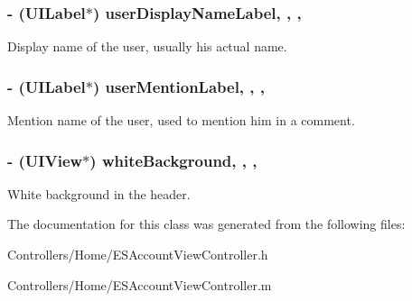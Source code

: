 \subsubsection[{user\+Display\+Name\+Label}]{\setlength{\rightskip}{0pt plus 5cm}-\/ (U\+I\+Label$\ast$) user\+Display\+Name\+Label\hspace{0.3cm}{\ttfamily [read]}, {\ttfamily [write]}, {\ttfamily [nonatomic]}, {\ttfamily [strong]}}\label{interface_e_s_account_view_controller_a4a3855adf0046a8e3d02466778099df2}
Display name of the user, usually his actual name. \hypertarget{interface_e_s_account_view_controller_a2c6e65c3ac71a2af27f3f3bb05d1b757}{}
\subsubsection[{user\+Mention\+Label}]{\setlength{\rightskip}{0pt plus 5cm}-\/ (U\+I\+Label$\ast$) user\+Mention\+Label\hspace{0.3cm}{\ttfamily [read]}, {\ttfamily [write]}, {\ttfamily [nonatomic]}, {\ttfamily [strong]}}\label{interface_e_s_account_view_controller_a2c6e65c3ac71a2af27f3f3bb05d1b757}
Mention name of the user, used to mention him in a comment. \hypertarget{interface_e_s_account_view_controller_ab6fc1d6fc319a61b4753414db9e2be7f}{}
\subsubsection[{white\+Background}]{\setlength{\rightskip}{0pt plus 5cm}-\/ (U\+I\+View$\ast$) white\+Background\hspace{0.3cm}{\ttfamily [read]}, {\ttfamily [write]}, {\ttfamily [nonatomic]}, {\ttfamily [strong]}}\label{interface_e_s_account_view_controller_ab6fc1d6fc319a61b4753414db9e2be7f}
White background in the header. 

The documentation for this class was generated from the following files\+:\begin{DoxyCompactItemize}
\item 
Controllers/\+Home/E\+S\+Account\+View\+Controller.\+h\item 
Controllers/\+Home/E\+S\+Account\+View\+Controller.\+m\end{DoxyCompactItemize}
